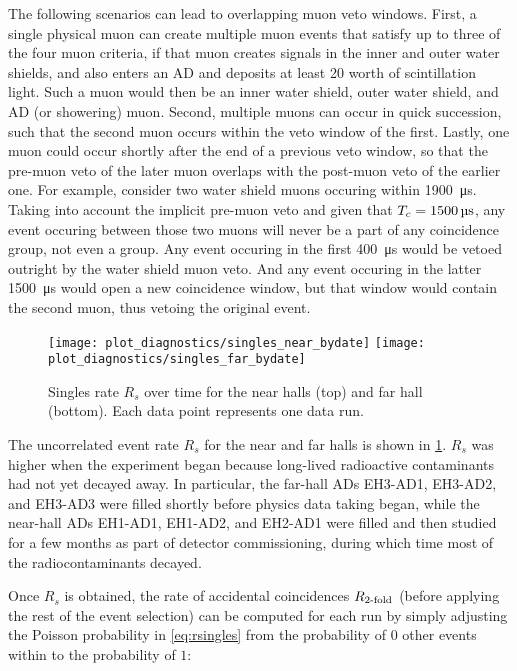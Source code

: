 The following scenarios can lead to overlapping muon veto windows.
First, a single physical muon can create multiple muon events
that satisfy up to three of the four muon criteria,
if that muon creates signals in the inner and outer water shields,
and also enters an AD and deposits at least \SI{20}{\mev} worth of scintillation light.
Such a muon would then be an inner water shield, outer water shield, and AD
(or showering) muon.
Second, multiple muons can occur in quick succession,
such that the second muon occurs within the veto window of the first.
Lastly, one muon could occur shortly after the end of a previous veto window,
so that the pre-muon veto of the later muon overlaps with the
post-muon veto of the earlier one.
For example, consider two water shield muons occuring within \SI{1900}{\micro\second}.
Taking into account the implicit pre-muon veto
and given that $T_c=\SI{1500}{\micro\second}$,
any event occuring between those two muons will never be
a part of any coincidence group, not even a  group.
Any event occuring in the first \SI{400}{\micro\second} would be vetoed outright
by the water shield muon veto.
And any event occuring in the latter \SI{1500}{\micro\second} would open a new
coincidence window, but that window would contain the second muon,
thus vetoing the original event.

\begin{figure}
    \texttt{[image: plot\_diagnostics/singles\_near\_bydate]}
    \texttt{[image: plot\_diagnostics/singles\_far\_bydate]}
    \caption{
        Singles rate $R_s$ over time for
        the near halls (top) and far hall (bottom).
        Each data point represents one data run.
    }
    \label{fig:singles}
\end{figure}

The uncorrelated event rate $R_s$ for the near and far halls is shown in
\cref{fig:singles}.
$R_s$ was higher when the experiment began because long-lived
radioactive contaminants had not yet decayed away.
In particular, the far-hall ADs EH3-AD1, EH3-AD2, and EH3-AD3
were filled shortly before physics data taking began,
while the near-hall ADs EH1-AD1, EH1-AD2, and EH2-AD1
were filled and then studied for a few months
as part of detector commissioning, during which time
most of the radiocontaminants decayed.

Once $R_s$ is obtained, the rate of accidental coincidences $R_{\text{\ensuremath{2}-fold}}$
(before applying the rest of the event selection)
can be computed for each run
by simply adjusting the Poisson probability in \cref{eq:rsingles}
from the probability of $0$ other events within \tc{}
to the probability of $1$:

